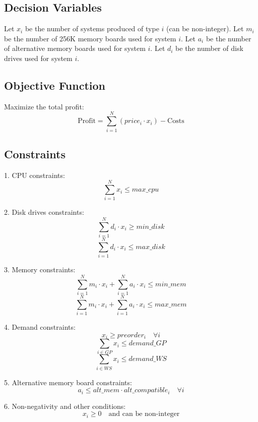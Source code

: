 \documentclass{article}
\begin{document}
\subsection*{Decision Variables}
Let \( x_i \) be the number of systems produced of type \( i \) (can be non-integer).  
Let \( m_i \) be the number of 256K memory boards used for system \( i \).  
Let \( a_i \) be the number of alternative memory boards used for system \( i \).  
Let \( d_i \) be the number of disk drives used for system \( i \).  

\subsection*{Objective Function}
Maximize the total profit:
\[
\text{Profit} = \sum_{i=1}^{N} (price_i \cdot x_i) - \text{Costs}
\]

\subsection*{Constraints}

1. CPU constraints:
\[
\sum_{i=1}^{N} x_i \leq max\_cpu
\]

2. Disk drives constraints:
\[
\sum_{i=1}^{N} d_i \cdot x_i \geq min\_disk
\]
\[
\sum_{i=1}^{N} d_i \cdot x_i \leq max\_disk
\]

3. Memory constraints:
\[
\sum_{i=1}^{N} m_i \cdot x_i + \sum_{i=1}^{N} a_i \cdot x_i \leq min\_mem
\]
\[
\sum_{i=1}^{N} m_i \cdot x_i + \sum_{i=1}^{N} a_i \cdot x_i \leq max\_mem
\]

4. Demand constraints:
\[
x_i \geq preorder_i \quad \forall i
\]
\[
\sum_{i \in GP} x_i \leq demand\_GP
\]
\[
\sum_{i \in WS} x_i \leq demand\_WS
\]

5. Alternative memory board constraints:
\[
a_i \leq alt\_mem \cdot alt\_compatible_i \quad \forall i
\]

6. Non-negativity and other conditions:
\[
x_i \geq 0 \quad \text{and can be non-integer}
\]
\end{document}
